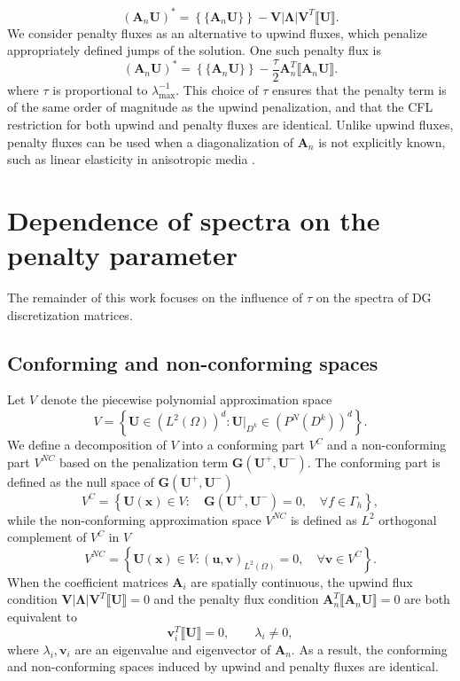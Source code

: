 \documentclass[10pt]{article}
\newcommand{\LRp}[1]{\left( #1 \right)}
\newcommand{\LRb}[1]{\left| #1 \right|}
\newcommand{\LRc}[1]{\left\{ #1 \right\}}
\newcommand{\jump}[1] {\ensuremath{\llbracket#1\rrbracket}}
\newcommand{\avg}[1] {\ensuremath{\LRc{\!\{#1\}\!}}}
\newcommand{\Gh}{\Gamma_h}
\begin{document}
\[
(\bm{A}_n\bm{U})^* = \avg{\bm{A}_n\bm{U}} - \bm{V}\LRb{\bm{\Lambda}}\bm{V}^T \jump{\bm{U}}.  
\]
We consider penalty fluxes as an alternative to upwind fluxes, which penalize appropriately defined jumps of the solution.  One such penalty flux is 
\[
(\bm{A}_n\bm{U})^* = \avg{\bm{A}_n\bm{U}} - \frac{\tau}{2} \bm{A}_n^T \jump{\bm{A}_n\bm{U}}.  
\]
where $\tau$ is proportional to $\lambda_{\max}^{-1}$.  This choice of $\tau$ ensures that the penalty term is of the same order of magnitude as the upwind penalization, and that the CFL restriction for both upwind and penalty fluxes are identical.  Unlike upwind fluxes, penalty fluxes can be used when a diagonalization of $\bm{A}_n$ is not explicitly known, such as linear elasticity in anisotropic media \cite{ye2016discontinuous}.  


\section{Dependence of spectra on the penalty parameter}

The remainder of this work focuses on the influence of $\tau$ on the spectra of DG discretization matrices.  

\subsection{Conforming and non-conforming spaces}

Let $V$ denote the piecewise polynomial approximation space 
\[
V = \LRc{ \bm{U} \in\LRp{ L^2(\Omega)}^d : \left.\bm{U}\right|_{D^k} \in \LRp{P^N(D^k)}^d}.  
\]
We define a decomposition of $V$ into a conforming part $V^C$ and a non-conforming part $V^{NC}$ based on the penalization term $\bm{G}(\bm{U}^+,\bm{U}^-)$.  The conforming part is defined as the null space of $\bm{G}(\bm{U}^+,\bm{U}^-)$
\begin{equation}
V^{C} = \LRc{ \bm{U}(\bm{x}) \in V: \quad  \bm{G}(\bm{U}^+,\bm{U}^-) = 0, \quad \forall f \in \Gh},
\label{eq:conf}
\end{equation}
while the non-conforming approximation space $V^{NC}$ is defined as $L^2$ orthogonal complement of $V^{C}$ in $V$
\[
V^{NC} = \LRc{ \bm{U}(\bm{x}) \in V: \LRp{\bm{u},\bm{v}}_{L^2(\Omega)} = 0, \quad \forall \bm{v}\in V^C}.
\]
When the coefficient matrices $\bm{A}_i$ are spatially continuous, the upwind flux condition $\bm{V}\LRb{\bm{\Lambda}}\bm{V}^T \jump{\bm{U}} = 0$ and the penalty flux condition $\bm{A}_n^T \jump{\bm{A}_n\bm{U}} = 0$ are both equivalent to
\[
\bm{v}_i^T \jump{\bm{U}} = 0, \qquad \lambda_i \neq 0,
\]
where $\lambda_i, \bm{v}_i$ are an eigenvalue and eigenvector of $\bm{A}_n$.  As a result, the conforming and non-conforming spaces induced by upwind and penalty fluxes are identical.  
\end{document}
